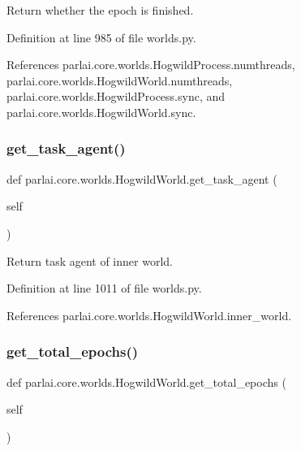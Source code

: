 \begin{DoxyVerb}Return whether the epoch is finished.\end{DoxyVerb}
 

Definition at line 985 of file worlds.\+py.



References parlai.\+core.\+worlds.\+Hogwild\+Process.\+numthreads, parlai.\+core.\+worlds.\+Hogwild\+World.\+numthreads, parlai.\+core.\+worlds.\+Hogwild\+Process.\+sync, and parlai.\+core.\+worlds.\+Hogwild\+World.\+sync.

\mbox{\label{classparlai_1_1core_1_1worlds_1_1HogwildWorld_a7dfc60f5229da37574c31479a0b2ce3a}} 
\subsubsection{\texorpdfstring{get\+\_\+task\+\_\+agent()}{get\_task\_agent()}}
{\footnotesize\ttfamily def parlai.\+core.\+worlds.\+Hogwild\+World.\+get\+\_\+task\+\_\+agent (\begin{DoxyParamCaption}\item[{}]{self }\end{DoxyParamCaption})}

\begin{DoxyVerb}Return task agent of inner world.\end{DoxyVerb}
 

Definition at line 1011 of file worlds.\+py.



References parlai.\+core.\+worlds.\+Hogwild\+World.\+inner\+\_\+world.

\mbox{\label{classparlai_1_1core_1_1worlds_1_1HogwildWorld_a6bc364b91906b14d792957c8eeed5206}} 
\subsubsection{\texorpdfstring{get\+\_\+total\+\_\+epochs()}{get\_total\_epochs()}}
{\footnotesize\ttfamily def parlai.\+core.\+worlds.\+Hogwild\+World.\+get\+\_\+total\+\_\+epochs (\begin{DoxyParamCaption}\item[{}]{self }\end{DoxyParamCaption})}

